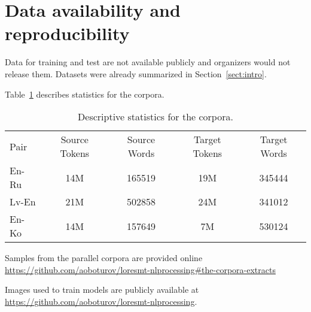 \documentclass[]{article}
\begin{document}
\section{Data availability and reproducibility}
\label{sect:data}

Data for training and test are not available publicly and organizers would not release them.
Datasets were already summarized in Section~\ref{sect:intro}.

Table~\ref{table:corpora_stats} describes statistics for the corpora.

\begin{table}[h!]
\begin{center}
\begin{tabular}{ l c c c c }
Pair & Source Tokens & Source Words & Target Tokens & Target Words \\
En-Ru & 14M & 165519 & 19M & 345444 \\
Lv-En & 21M & 502858 & 24M & 341012 \\
En-Ko & 14M & 157649 & 7M & 530124 \\
\end{tabular}
\end{center}
\caption{Descriptive statistics for the corpora.}
\label{table:corpora_stats}
\end{table}

Samples from the parallel corpora are provided online \url{https://github.com/aoboturov/loresmt-nlprocessing\#the-corpora-extracts}

Images used to train models are publicly available at \url{https://github.com/aoboturov/loresmt-nlprocessing}.

\small



\end{document}
